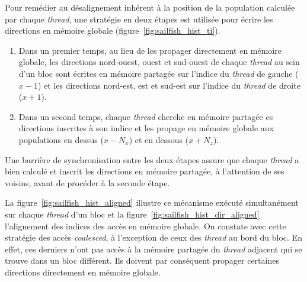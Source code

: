 Pour remédier au désalignement inhérent à la position de la population calculée par chaque \textit{thread}, une stratégie en deux étapes est utilisée pour écrire les directions en mémoire globale (figure~\ref{fig:sailfish_hist_ti}). 
\begin{enumerate}
\item Dans un premier temps, au lieu de les propager directement en mémoire globale, les directions nord-ouest, ouest et sud-ouest de chaque \textit{thread} au sein d'un bloc sont écrites en mémoire partagée sur l'indice du \textit{thread} de gauche ($x-1$) et les directions nord-est, est et sud-est sur l'indice du \textit{thread} de droite ($x+1$).
\item Dans un second temps, chaque \textit{thread} cherche en mémoire partagée es directions inscrites à son indice et les propage en mémoire globale aux populations en dessus ($x - N_x$) et en dessous ($x + N_z$).
\end{enumerate}
Une barrière de synchronisation entre les deux étapes assure que chaque \textit{thread} a bien calculé et inscrit les directions en mémoire partagée, à l'attention de ses voisins, avant de procéder à la seconde étape.

La figure~\ref{fig:sailfish_hist_aligned} illustre ce mécanisme exécuté simultanément sur chaque \textit{thread} d'un bloc et la figure~\ref{fig:sailfish_hist_dir_aligned} l'alignement des indices des accès en mémoire globale. On constate avec cette stratégie des accès \textit{coalesced}, à l'exception de ceux des \textit{thread} au bord du bloc. En effet, ces derniers n'ont pas accès à la mémoire partagée du \textit{thread} adjacent qui se trouve dans un bloc différent. Ils doivent par conséquent propager certaines directions directement en mémoire globale.

